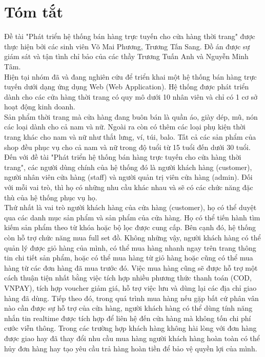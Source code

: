 \section*{Tóm tắt}
\thispagestyle{empty}

Đề tài "Phát triển hệ thống bán hàng trực tuyến cho cửa hàng thời trang" được thực hiện bởi các sinh viên Võ Mai Phương, Trương Tấn Sang. Đồ án được sự giám sát và tận tình chỉ bảo của các thầy Trương Tuấn Anh và Nguyễn Minh Tâm. \\

Hiện tại nhóm đã và đang nghiên cứu để triển khai một hệ thống bán hàng trực tuyến dưới dạng ứng dụng Web (Web Application). Hệ thống được phát triển dành cho các cửa hàng thời trang có quy mô dưới 10 nhân viên và chỉ có 1 cơ sở hoạt động kinh doanh.\\

Sản phẩm thời trang mà cửa hàng đang buôn bán là quần áo, giày dép, mũ, nón các loại dành cho cả nam và nữ. Ngoài ra còn có thêm các loại phụ kiện thời trang khác cho nam và nữ như thắt lưng, ví, túi, balo. Tất cả các sản phẩm của shop đều phục vụ cho cả nam và nữ trong độ tuổi từ 15 tuổi đến dưới 30 tuổi. \\

Đến với đề tài "Phát triển hệ thống bán hàng trực tuyến cho cửa hàng thời trang", các người dùng chính của hệ thống đó là người khách hàng (customer), người nhân viên cửa hàng (staff) và người quản trị viên cửa hàng (admin). Đối với mỗi vai trò, thì họ có những nhu cầu khác nhau và sẽ có các chức năng đặc thù của hệ thống phục vụ họ.\\

Thứ nhất là vai trò người khách hàng của cửa hàng (customer), họ có thể duyệt qua các danh mục sản phẩm và sản phẩm của cửa hàng. Họ có thể tiến hành tìm kiếm sản phẩm theo từ khóa hoặc bộ lọc được cung cấp. Bên cạnh đó, hệ thống còn hỗ trợ chức năng mua full set đồ. Không những vậy, người khách hàng có thể quản lý được giỏ hàng của mình, có thể mua hàng nhanh ngay trên trang thông tin chi tiết sản phẩm, hoặc có thể mua hàng từ giỏ hàng hoặc cũng có thể mua hàng từ các đơn hàng đã mua trước đó. Việc mua hàng cũng sẽ được hỗ trợ một cách thuận tiện nhất bằng việc tích hợp nhiều phương thức thanh toán (COD, VNPAY), tích hợp voucher giảm giá, hỗ trợ việc lưu và dùng lại các địa chỉ giao hàng đã dùng. Tiếp theo đó, trong quá trình mua hàng nếu gặp bất cứ phân vân nào cần được sự hỗ trợ của cửa hàng, người khách hàng có thể dùng tính năng nhắn tin realtime được tích hợp để liên hệ đến cửa hàng mà không tốn chi phí cước viễn thông. Trong các trường hợp khách hàng không hài lòng với đơn hàng được giao hay đã thay đổi nhu cầu mua hàng người khách hàng hoàn toàn có thể hủy đơn hàng hay tạo yêu cầu trả hàng hoàn tiền để bảo vệ quyền lợi của mình. \\

